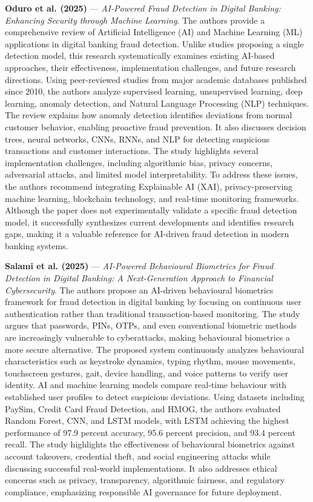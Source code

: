 \documentclass[conference]{IEEEtran}
\begin{document}
\noindent\textbf{Oduro et al. (2025)}\nocite{Oduro2025AIFraudDetection} --- \emph{AI-Powered Fraud Detection in Digital Banking: Enhancing Security through Machine Learning}. The authors provide a comprehensive review of Artificial Intelligence (AI) and Machine Learning (ML) applications in digital banking fraud detection. Unlike studies proposing a single detection model, this research systematically examines existing AI-based approaches, their effectiveness, implementation challenges, and future research directions. Using peer-reviewed studies from major academic databases published since 2010, the authors analyze supervised learning, unsupervised learning, deep learning, anomaly detection, and Natural Language Processing (NLP) techniques. The review explains how anomaly detection identifies deviations from normal customer behavior, enabling proactive fraud prevention. It also discusses decision trees, neural networks, CNNs, RNNs, and NLP for detecting suspicious transactions and customer interactions. The study highlights several implementation challenges, including algorithmic bias, privacy concerns, adversarial attacks, and limited model interpretability. To address these issues, the authors recommend integrating Explainable AI (XAI), privacy-preserving machine learning, blockchain technology, and real-time monitoring frameworks. Although the paper does not experimentally validate a specific fraud detection model, it successfully synthesizes current developments and identifies research gaps, making it a valuable reference for AI-driven fraud detection in modern banking systems.

\par\medskip

\noindent\textbf{Salami et al. (2025)}\nocite{Salami2025BehaviouralBiometrics} --- \emph{AI-Powered Behavioural Biometrics for Fraud Detection in Digital Banking: A Next-Generation Approach to Financial Cybersecurity}. The authors propose an AI-driven behavioural biometrics framework for fraud detection in digital banking by focusing on continuous user authentication rather than traditional transaction-based monitoring. The study argues that passwords, PINs, OTPs, and even conventional biometric methods are increasingly vulnerable to cyberattacks, making behavioural biometrics a more secure alternative. The proposed system continuously analyzes behavioural characteristics such as keystroke dynamics, typing rhythm, mouse movements, touchscreen gestures, gait, device handling, and voice patterns to verify user identity. AI and machine learning models compare real-time behaviour with established user profiles to detect suspicious deviations. Using datasets including PaySim, Credit Card Fraud Detection, and HMOG, the authors evaluated Random Forest, CNN, and LSTM models, with LSTM achieving the highest performance of 97.9 percent accuracy, 95.6 percent precision, and 93.4 percent recall. The study highlights the effectiveness of behavioural biometrics against account takeovers, credential theft, and social engineering attacks while discussing successful real-world implementations. It also addresses ethical concerns such as privacy, transparency, algorithmic fairness, and regulatory compliance, emphasizing responsible AI governance for future deployment.
\end{document}
